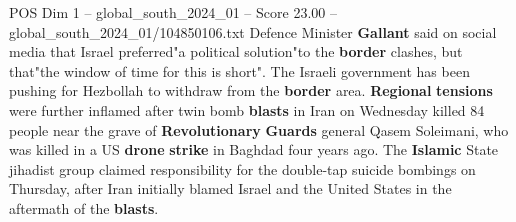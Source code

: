 \begin{textsample}{POS Dim 1 – global\_south\_2024\_01 – Score 23.00 – global\_south\_2024\_01/104850106.txt}
Defence Minister \textbf{Gallant} said on social media that Israel preferred"a political solution"to the \textbf{border} clashes, but that"the window of time for this is short".
The Israeli government has been pushing for Hezbollah to withdraw from the \textbf{border} area. \textbf{Regional} \textbf{tensions} were further inflamed after twin bomb \textbf{blasts} in Iran on Wednesday killed 84 people near the grave of \textbf{Revolutionary} \textbf{Guards} general Qasem Soleimani, who was killed in a US \textbf{drone} \textbf{strike} in Baghdad four years ago.
The \textbf{Islamic} State jihadist group claimed responsibility for the double-tap suicide bombings on Thursday, after Iran initially blamed Israel and the United States in the aftermath of the \textbf{blasts}.

\end{textsample}
